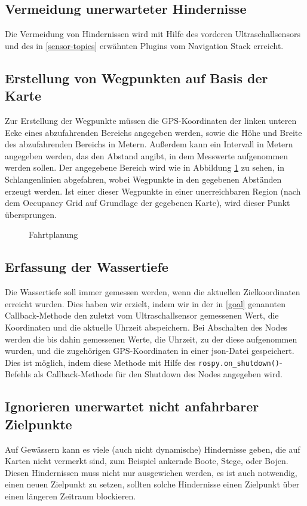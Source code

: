 \documentclass[11pt]{article}
\begin{document}
\subsection{Vermeidung unerwarteter Hindernisse}
Die Vermeidung von Hindernissen wird mit Hilfe des vorderen Ultraschallsensors und des in \ref{sensor-topics} erwähnten Plugins vom Navigation Stack erreicht.

\subsection{Erstellung von Wegpunkten auf Basis der Karte}
Zur Erstellung der Wegpunkte müssen die GPS-Koordinaten der linken unteren Ecke eines abzufahrenden Bereichs angegeben werden, sowie die Höhe und Breite des abzufahrenden Bereichs in Metern. Außerdem kann ein Intervall in Metern angegeben werden, das den Abstand angibt, in dem Messwerte aufgenommen werden sollen. Der angegebene Bereich wird wie in Abbildung \ref{Fahrtplanung} zu sehen, in Schlangenlinien abgefahren, wobei Wegpunkte in den gegebenen Abständen erzeugt werden. Ist einer dieser Wegpunkte in einer unerreichbaren Region (nach dem Occupancy Grid auf Grundlage der gegebenen Karte), wird dieser Punkt übersprungen.

\begin{figure}[h]
	\centering
	\resizebox{0.8\textwidth}{!}{}
	\caption{Fahrtplanung}
	\label{Fahrtplanung}
\end{figure}

\subsection{Erfassung der Wassertiefe} \label{measurements}
Die Wassertiefe soll immer gemessen werden, wenn die aktuellen Zielkoordinaten erreicht wurden. Dies haben wir erzielt, indem wir in der in \ref{goal} genannten Callback-Methode den zuletzt vom Ultraschallsensor gemessenen Wert, die Koordinaten und die aktuelle Uhrzeit abspeichern. Bei Abschalten des Nodes werden die bis dahin gemessenen Werte, die Uhrzeit, zu der diese aufgenommen wurden, und die zugehörigen GPS-Koordinaten in einer json-Datei gespeichert. Dies ist möglich, indem diese Methode mit Hilfe des \texttt{rospy.on\_shutdown()}-Befehls als Callback-Methode für den Shutdown des Nodes angegeben wird.

\subsection{Ignorieren unerwartet nicht anfahrbarer Zielpunkte}
Auf Gewässern kann es viele (auch nicht dynamische) Hindernisse geben, die auf Karten nicht vermerkt sind, zum Beispiel ankernde Boote, Stege, oder Bojen. Diesen Hindernissen muss nicht nur ausgewichen werden, es ist auch notwendig, einen neuen Zielpunkt zu setzen, sollten solche Hindernisse einen Zielpunkt über einen längeren Zeitraum blockieren. 
\end{document}

